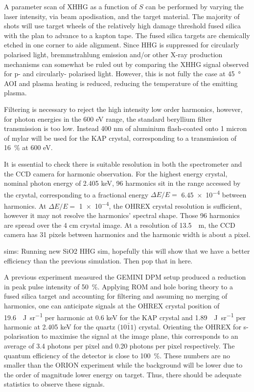 A parameter scan of \ac{XHHG} as a function of $S$ can be performed by varying the laser intensity, via beam apodisation, and the target material. The majority of shots will use target wheels of the relatively high damage threshold fused silica with the plan to advance to a kapton tape. The fused silica targets are chemically etched in one corner to aide alignment.
Since HHG is suppressed for circularly polarised light, bremmstrahlung emission and/or other X-ray production mechanisms can somewhat be ruled out by comparing the \ac{XHHG} signal observed for p- and circularly- polarised light. However, this is not fully the case at \qty{45}{\degree} \ac{AOI} and plasma heating is reduced, reducing the temperature of the emitting plasma.

Filtering is necessary to reject the high intensity low order harmonics, however, for photon energies in the 600 eV range, the standard beryllium filter transmission is too low. Instead 400 nm of aluminium flash-coated onto 1 micron of mylar will be used for the KAP crystal, corresponding to a transmission of \qty{16}{\%} at 600 eV.

It is essential to check there is suitable resolution in both the spectrometer and the CCD camera for harmonic observation. For the highest energy crystal, nominal photon energy of 2.405 keV, 96 harmonics sit in the range accessed by the crystal, corresponding to a fractional energy $\Delta E/E =$ \num{6.45e-4} between harmonics. At  $\Delta E/E =$ \num{1e-4}, the OHREX crystal resolution is sufficient, however it may not resolve the harmonics' spectral shape. Those 96 harmonics are spread over the 4 cm crystal image. At a resolution of \qty{13.5}{\mu m}, the CCD camera has 31 pixels between harmonics and the harmonic width is about a pixel.

sims:
Running new SiO2 HHG sim, hopefully this will show that we have a better efficiency than the previous simulation. Then pop that in here.

A previous experiment measured the GEMINI DPM setup produced a reduction in peak pulse intensity of \qty{50}{\%}. Applying ROM and hole boring theory to a fused silica target and accounting for filtering and assuming no merging of harmonics, one can anticipate signals at the OHREX crystal position of \qty{19.6}{\mu J.sr^{-1}} per harmonic at 0.6 keV for the KAP crystal and \qty{1.89}{\mu J.sr^{-1}} per harmonic at 2.405 keV for the quartz ($10\bar{1}1$) crystal. Orienting the OHREX for s-polarisation to maximise the signal at the image plane, this corresponds to an average of 3.4 photons per pixel and 0.20 photons per pixel respectively. The quantum efficiency of the detector is close to \qty{100}{\%}. These numbers are no smaller than the ORION experiment while the background will be lower due to the order of magnitude lower energy on target. Thus, there should be adequate statistics to observe these signals.

